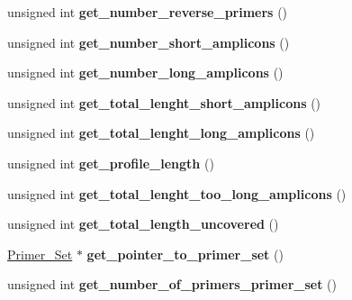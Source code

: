\begin{DoxyCompactItemize}
unsigned int {\bfseries get\+\_\+number\+\_\+reverse\+\_\+primers} ()
\item 
\mbox{\label{class_p_c_r___profile_ae1470db4482cb29be8e29b96f913023c}} 
unsigned int {\bfseries get\+\_\+number\+\_\+short\+\_\+amplicons} ()
\item 
\mbox{\label{class_p_c_r___profile_a91a98d9005a63450de3f782c9374972a}} 
unsigned int {\bfseries get\+\_\+number\+\_\+long\+\_\+amplicons} ()
\item 
\mbox{\label{class_p_c_r___profile_aa8f3e8fc43865af8734090436a0d729e}} 
unsigned int {\bfseries get\+\_\+total\+\_\+lenght\+\_\+short\+\_\+amplicons} ()
\item 
\mbox{\label{class_p_c_r___profile_adf41a697d05489582745d650d4e7c956}} 
unsigned int {\bfseries get\+\_\+total\+\_\+lenght\+\_\+long\+\_\+amplicons} ()
\item 
\mbox{\label{class_p_c_r___profile_ad25903940b769ad48abaf472175e5ccf}} 
unsigned int {\bfseries get\+\_\+profile\+\_\+length} ()
\item 
\mbox{\label{class_p_c_r___profile_a0c37a463d8adedb60c5b4d8d213c182e}} 
unsigned int {\bfseries get\+\_\+total\+\_\+lenght\+\_\+too\+\_\+long\+\_\+amplicons} ()
\item 
\mbox{\label{class_p_c_r___profile_abcd1baf20c93c633b00b1fbd3e662b8f}} 
unsigned int {\bfseries get\+\_\+total\+\_\+length\+\_\+uncovered} ()
\item 
\mbox{\label{class_p_c_r___profile_a24577af6213a4f6ae4215d19836c5673}} 
\mbox{\hyperlink{class_primer___set}{Primer\+\_\+\+Set}} $\ast$ {\bfseries get\+\_\+pointer\+\_\+to\+\_\+primer\+\_\+set} ()
\item 
\mbox{\label{class_p_c_r___profile_a3adc7245807935d0d10c7600593254a2}} 
unsigned int {\bfseries get\+\_\+number\+\_\+of\+\_\+primers\+\_\+primer\+\_\+set} ()
\item 
\mbox{\label{class_p_c_r___profile_a43b9d518bca0cd7f37ce008fcfa1b37b}} 

\end{DoxyCompactItemize}
